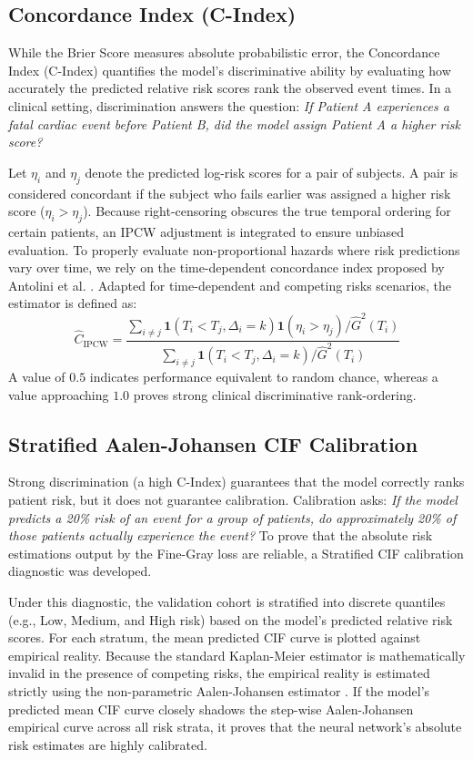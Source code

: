 \documentclass[a4paper,twoside,12pt]{report}
\begin{document}
\subsection{Concordance Index (C-Index)}
While the Brier Score measures absolute probabilistic error, the Concordance Index (C-Index) quantifies the model's discriminative ability by evaluating how accurately the predicted relative risk scores rank the observed event times. In a clinical setting, discrimination answers the question: \textit{If Patient A experiences a fatal cardiac event before Patient B, did the model assign Patient A a higher risk score?}

Let $\eta_i$ and $\eta_j$ denote the predicted log-risk scores for a pair of subjects. A pair is considered concordant if the subject who fails earlier was assigned a higher risk score ($\eta_i > \eta_j$). Because right-censoring obscures the true temporal ordering for certain patients, an IPCW adjustment is integrated to ensure unbiased evaluation. To properly evaluate non-proportional hazards where risk predictions vary over time, we rely on the time-dependent concordance index proposed by Antolini et al. \citep{Antolini2005}. Adapted for time-dependent and competing risks scenarios, the estimator is defined as:
$$\widehat{C}_{\text{IPCW}} = \frac{ \sum_{i \neq j} \mathbf{1}(T_i < T_j, \Delta_i = k) \mathbf{1}(\eta_i > \eta_j) / \hat{G}^2(T_i) }{ \sum_{i \neq j} \mathbf{1}(T_i < T_j, \Delta_i = k) / \hat{G}^2(T_i) }$$
A value of $0.5$ indicates performance equivalent to random chance, whereas a value approaching $1.0$ proves strong clinical discriminative rank-ordering.

\subsection{Stratified Aalen-Johansen CIF Calibration}
Strong discrimination (a high C-Index) guarantees that the model correctly ranks patient risk, but it does not guarantee calibration. Calibration asks: \textit{If the model predicts a 20\% risk of an event for a group of patients, do approximately 20\% of those patients actually experience the event?} To prove that the absolute risk estimations output by the Fine-Gray loss are reliable, a Stratified CIF calibration diagnostic was developed.

Under this diagnostic, the validation cohort is stratified into discrete quantiles (e.g., Low, Medium, and High risk) based on the model's predicted relative risk scores. For each stratum, the mean predicted CIF curve is plotted against empirical reality. Because the standard Kaplan-Meier estimator is mathematically invalid in the presence of competing risks, the empirical reality is estimated strictly using the non-parametric Aalen-Johansen estimator \citep{aalen1978empirical}. If the model's predicted mean CIF curve closely shadows the step-wise Aalen-Johansen empirical curve across all risk strata, it proves that the neural network's absolute risk estimates are highly calibrated.
\end{document}

